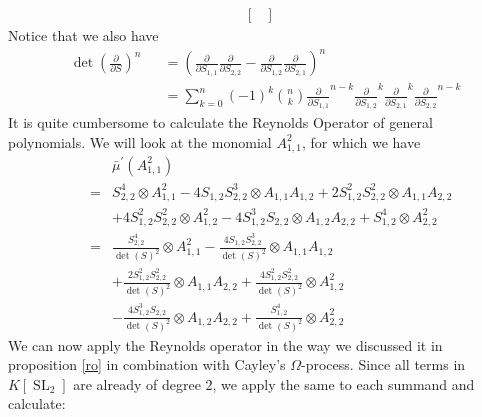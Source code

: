\begin{example}
\begin{equation}
\begin{aligned}
\begin{bmatrix}
      \end{bmatrix}
    \end{aligned}
  \end{equation}
  Notice that we also have
  \begin{equation}
    \begin{aligned}
      &\operatorname{det}\left( \frac{\partial}{\partial S} \right)^n
      &&= \left( \frac{\partial}{\partial S_{1,1}} \frac{\partial}{\partial S_{2,2}} - \frac{\partial}{\partial S_{1,2}} \frac{\partial}{\partial S_{2,1}} \right)^n \\
      &&&= \sum_{k=0}^n (-1)^k \binom{n}{k} \frac{\partial}{\partial S_{1,1}}^{n-k} \frac{\partial}{\partial S_{1,2}}^k \frac{\partial}{\partial S_{2,1}}^k \frac{\partial}{\partial S_{2,2}}^{n-k}
    \end{aligned}
  \end{equation}
  It is quite cumbersome to calculate the Reynolds Operator of general polynomials.
  We will look at the monomial $A_{1,1}^2$, for which we have
  \begin{equation}
    \begin{aligned}
      &&&\bar{\mu}^\prime (A_{1,1}^2) \\
      &&=& S_{2,2}^4 \otimes A_{1,1}^2 - 4S_{1,2}S_{2,2}^3 \otimes A_{1,1}A_{1,2} + 2S_{1,2}^2 S_{2,2}^2 \otimes A_{1,1}A_{2,2} \\
      &&& + 4S_{1,2}^2 S_{2,2}^2 \otimes A_{1,2}^2 - 4S_{1,2}^3 S_{2,2} \otimes A_{1,2}A_{2,2} + S_{1,2}^4 \otimes A_{2,2}^2\\
      &&=& \frac{S_{2,2}^4}{\operatorname{det}(S)^2} \otimes A_{1,1}^2 - \frac{4S_{1,2}S_{2,2}^3}{\operatorname{det}(S)^2} \otimes A_{1,1}A_{1,2} \\
      &&& + \frac{2S_{1,2}^2 S_{2,2}^2}{\operatorname{det}(S)^2} \otimes A_{1,1}A_{2,2} + \frac{4S_{1,2}^2 S_{2,2}^2}{\operatorname{det}(S)^2} \otimes A_{1,2}^2 \\
      &&& - \frac{4S_{1,2}^3 S_{2,2}}{\operatorname{det}(S)^2} \otimes A_{1,2}A_{2,2} + \frac{S_{1,2}^4}{\operatorname{det}(S)^2} \otimes A_{2,2}^2
    \end{aligned}
  \end{equation}
  We can now apply the Reynolds operator in the way we discussed it in proposition \ref{ro} in combination with Cayley's $\Omega$-process.
  Since all terms in $K[\operatorname{SL}_2]$ are already of degree $2$, we apply the same to each summand and calculate:
  \begin{equation}
    \begin{aligned}

\end{aligned}
\end{equation}
\end{example}
